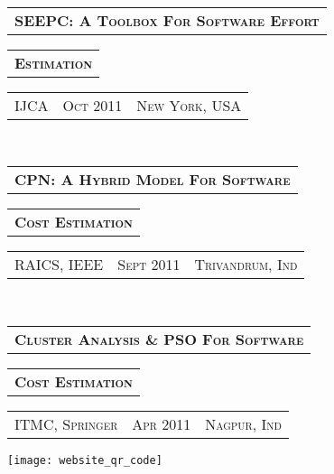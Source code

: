 \documentclass[10pt,a4paper,oneside]{article}
\begin{document}
\begin{minipage}[t]{0.33\textwidth}
        \vspace{10pt}\\
        \begin{tabular}{c}
            \textbf{\normalsize SEEPC: A T\textsc{oolbox}
            F\textsc{or} S\textsc{oftware} E\textsc{ffort}}
        \end{tabular}
        \begin{tabular}{c}
            \textbf{E\textsc{stimation}}
       \end{tabular}
        \textcolor{light-gray}{
            \begin{tabular}{c|c|c}
                \textmd{\normalsize IJCA}
                &{\small O\textsc{ct 2011}}
                &{\small N\textsc{ew} Y\textsc{ork}, USA}
            \end{tabular}
        }\\ 
        \begin{tabular}{c}
            \textbf{\normalsize CPN: A H\textsc{ybrid}
            M\textsc{odel} F\textsc{or} S\textsc{oftware}}\\
        \end{tabular}
        \begin{tabular}{c}
            \textbf{C\textsc{ost} E\textsc{stimation}}
        \end{tabular}
        \textcolor{light-gray}{
            \begin{tabular}{c|c|c}
                 {\small RAICS, IEEE}
                &{\small S\textsc{ept 2011}}
                &{\small T\textsc{rivandrum}, I\textsc{nd}}
            \end{tabular}
        }\\
        \begin{tabular}{c}
       	    \textbf{\normalsize C\textsc{luster} A\textsc{nalysis} \& PSO F\textsc{or} S\textsc{oftware}}
        \end{tabular}
        \begin{tabular}{c}
            \textbf{C\textsc{ost} E\textsc{stimation}}
        \end{tabular}
        \textcolor{light-gray}{
            \begin{tabular}{c|c|c}
                \textmd{\normalsize ITMC, S\textsc{pringer}}
                &{\small A\textsc{pr 2011}}
                &{\small N\textsc{agpur}, I\textsc{nd}}
            \end{tabular}
        }
        \vspace{-10pt}
        \begin{center}
            \texttt{[image: website\_qr\_code]}
        \end{center}
    \end{minipage}
\end{document}
